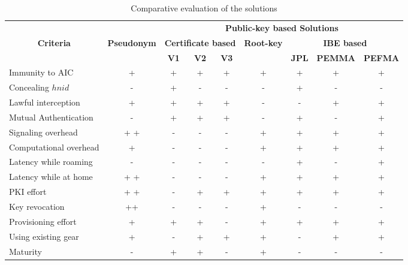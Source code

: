 \documentclass{river-journal}
\begin{document}
\begin{table}
\begin{tiny}
 \begin{center}
\caption{Comparative evaluation of the solutions}
\begin{tabular}[t]{|l|c|c|c|c|c|c|c|c|}
\hline
\multicolumn{1}{|c|}{} & \multicolumn{1}{|c|}{} & \multicolumn{7}{|c|}{\textbf{Public-key based Solutions}}\\
\cline{3-9}
\multicolumn{1}{|c|}{\textbf{Criteria}} & \multicolumn{1}{|c|}{\textbf{Pseudonym}} & \multicolumn{3}{|c|}{\textbf{Certificate based}} & \multicolumn{1}{|c|}{\textbf{Root-key}} & \multicolumn{3}{|c|}{\textbf{IBE based}}\\
\cline{3-5} \cline{7-9}
\textbf{} &  & \textbf{V1} & \textbf{V2} & \textbf{V3} & \textbf{} & \textbf{JPL} & \textbf{PEMMA} & \textbf{PEFMA}\\
\hline \hline
Immunity to AIC & + & + & + & + & + & + & + & + \\ \hline
Concealing $hnid$ & - & + & - & - & - & + & - & - \\ \hline
Lawful interception & + & + & + & + & - & - & + & + \\ \hline
Mutual Authentication & - & + & + & + & - & + & - & + \\ \hline
Signaling overhead & + + & - & - & - & + & + & + & + \\ \hline
Computational overhead & + & - & - & - & + & + & + & + \\ \hline
Latency while roaming & - & - & -  & - & - & + & - & + \\ \hline
Latency while at home & + + & - & -  & - & + & + & + & + \\ \hline
PKI effort & + + &  - & + & + & + & + & + & + \\ \hline
Key revocation & ++ & - & - & - & + & - & - & - \\ \hline
Provisioning effort & + & + & + & - & + & + & + & + \\ \hline
Using existing gear & + & - & + & + & + & - & + & + \\ \hline
Maturity  & - & + & + & - & + & - & - & - \\ \hline
\end{tabular}
\label{table:comparison}
\end{center}
\end{tiny}
\end{table}
\end{document}
